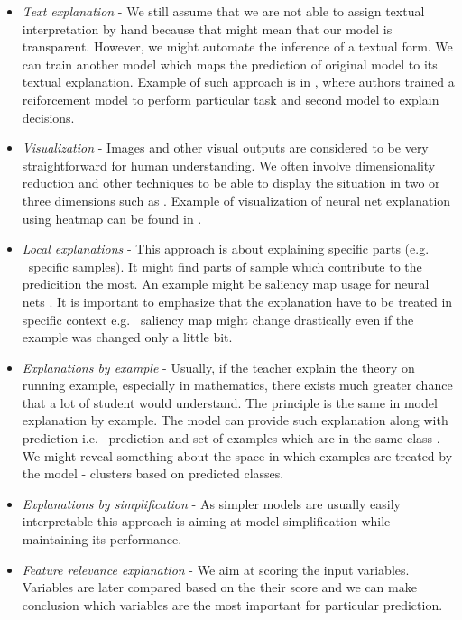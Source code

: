 \begin{itemize}
    \item \emph{Text explanation} - We still assume that we are not able to assign textual interpretation by hand because that might mean that our model is transparent. However, we might automate the inference of a textual form. We can train another model which maps the prediction of original model to its textual explanation. Example of such approach is in \cite{Krening2017}, where authors trained a reiforcement model to perform particular task and second model to explain decisions.
    \item \emph{Visualization} - Images and other visual outputs are considered to be very straightforward for human understanding. We often involve dimensionality reduction and other techniques to be able to display the situation in two or three dimensions such as \cite{Pearson1901}. Example of visualization of neural net explanation using heatmap can be found in \cite{Zeiler2013}.
    \item \emph{Local explanations} - This approach is about explaining specific parts (e.g. \ specific samples). It might find parts of sample which contribute to the predicition the most. An example might be saliency map usage for neural nets \cite{Simonyan2014}. It is important to emphasize that the explanation have to be treated in specific context e.g. \ saliency map might change drastically even if the example was changed only a little bit.
    \item \emph{Explanations by example} - Usually, if the teacher explain the theory on running example, especially in mathematics, there exists much greater chance that a lot of student would understand. The principle is the same in model explanation by example. The model can provide such explanation along with prediction i.e. \ prediction and set of examples which are in the same class  \cite{Caruana1999}. We might reveal something about the space in which examples are treated by the model - clusters based on predicted classes.
    \item \emph{Explanations by simplification} - As simpler models are usually easily interpretable this approach is aiming at model simplification while maintaining its performance.
    \item \emph{Feature relevance explanation} - We aim at scoring the input variables. Variables are later compared based on the their score and we can make conclusion which variables are the most important for particular prediction.
\end{itemize}

